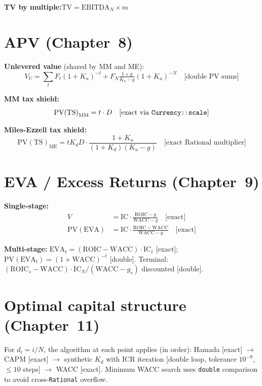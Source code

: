 \documentclass[12pt, a4paper, oneside]{book}
\newcommand{\WACC}{\ensuremath{\mathrm{WACC}}}
\newcommand{\ROIC}{\ensuremath{\mathrm{ROIC}}}
\newcommand{\IC}{\ensuremath{\mathrm{IC}}}
\newcommand{\TV}{\ensuremath{\mathrm{TV}}}
\newcommand{\EVA}{\ensuremath{\mathrm{EVA}}}
\newcommand{\Kd}{K_d}
\newcommand{\Ku}{K_u}
\begin{document}
\textbf{TV by multiple:}\quad $\TV = \mathrm{EBITDA}_N\times m$ \quad[exact]

\section{APV (Chapter~8)}

\textbf{Unlevered value} (shared by MM and ME):
\begin{equation}
  V_U = \textstyle\sum_t F_t(1+\Ku)^{-t}
        + F_N\tfrac{1+g}{\Ku-g}(1+\Ku)^{-N} \quad\text{[double PV sums]}
\end{equation}

\textbf{MM tax shield:}
\begin{equation}
  \mathrm{PV(TS)}_{\mathrm{MM}} = t\cdot D \quad\text{[exact via \texttt{Currency::scale}]}
\end{equation}

\textbf{Miles-Ezzell tax shield:}
\begin{equation}
  \mathrm{PV(TS)}_{\mathrm{ME}}
  = t\Kd D\cdot\frac{1+\Ku}{(1+\Kd)(\Ku-g)}
  \quad\text{[exact Rational multiplier]}
\end{equation}

\section{EVA / Excess Returns (Chapter~9)}

\textbf{Single-stage:}
\begin{align}
  V &= \IC\cdot\frac{\ROIC-g}{\WACC-g} \quad\text{[exact]}\\
  \mathrm{PV(EVA)} &= \IC\cdot\frac{\ROIC-\WACC}{\WACC-g} \quad\text{[exact]}
\end{align}

\textbf{Multi-stage:} $\EVA_t = (\ROIC-\WACC)\cdot\IC_t$ [exact];
$\mathrm{PV}(\EVA_t)=(1+\WACC)^{-t}$ [double].
Terminal: $(\ROIC_s-\WACC)\cdot\IC_N/(\WACC-g_s)$ discounted [double].

\section{Optimal capital structure (Chapter~11)}

For $d_i = i/N$, the algorithm at each point applies (in order):
Hamada [exact] $\to$ CAPM [exact] $\to$ synthetic $\Kd$ with ICR
iteration [double loop, tolerance $10^{-9}$, $\leq 10$ steps] $\to$
WACC [exact]. Minimum WACC search uses \texttt{double} comparison to
avoid cross-\texttt{Rational} overflow.
\end{document}
